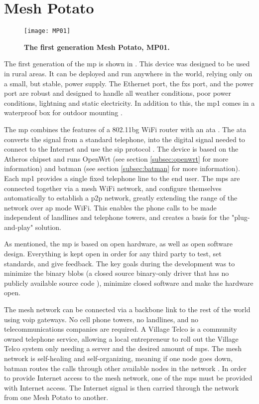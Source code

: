 \section{Mesh Potato}

\begin{figure}[b]
  \centering
      \texttt{[image: MP01]}
  \caption [MP01]{\textbf{The first generation Mesh Potato, MP01.}}
  \label{fig:MP01}
\end{figure}

The first generation of the \gls{mp} is shown in . This device was designed to be used in rural areas. It can be deployed and run anywhere in the world, relying only on a small, but stable, power supply. The Ethernet port, the \gls{fxs} port, and the power port are robust and designed to handle all weather conditions, poor power conditions, lightning and static electricity. In addition to this, the \gls{mp1} comes in a waterproof box for outdoor mounting \cite{background}.

The \gls{mp} combines the features of a 802.11bg WiFi router with an \gls{ata} \cite{MP}. The \gls{ata} converts the signal from a standard telephone, into the digital signal needed to connect to the Internet and use the \gls{sip} protocol \cite{MParticle}. The device is based on the Atheros chipset and runs OpenWrt (see section \ref{subsec:openwrt} for more information) and \gls{batman} (see section \ref{subsec:batman} for more information). Each \gls{mp1} provides a single fixed telephone line to the end user. The \glspl{mp} are connected together via a mesh WiFi network, and configure themselves automatically to establish a \gls{p2p} network, greatly extending the range of the network over \gls{ap} mode WiFi. This enables the phone calls to be made independent of landlines and telephone towers, and creates a basis for the "plug-and-play" solution. 

As mentioned, the \gls{mp} is based on open hardware, as well as open software design. Everything is kept open in order for any third party to test, set standards, and give feedback. The key goals during the development was to minimize the binary blobs (a closed source binary-only driver that has no publicly available source code \cite{binaryBolb}), minimize closed software and make the hardware open. 

The mesh network can be connected via a backbone link to the rest of the world using \gls{voip} gateways. No cell phone towers, no landlines, and no telecommunications companies are required. A Village Telco is a community owned telephone service, allowing a local entrepreneur to roll out the Village Telco system only needing a server and the desired amount of \glspl{mp}. The mesh network is self-healing and self-organizing, meaning if one node goes down, \gls{batman} routes the calls through other available nodes in the network \cite{MPbyRowe}. In order to provide Internet access to the mesh network, one of the \glspl{mp} must be provided with Internet access. The Internet signal is then carried through the network from one Mesh Potato to another. 


